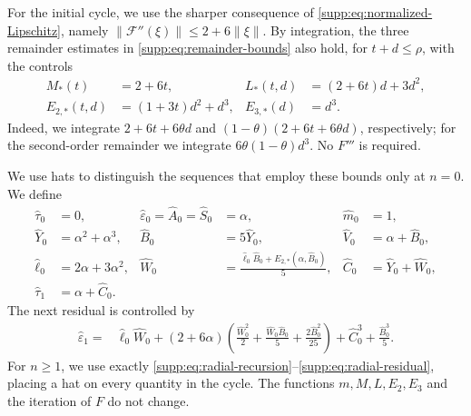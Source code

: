 \documentclass[11pt,a4paper]{article}
\numberwithin{equation}{section}
\numberwithin{table}{section}
\theoremstyle{plain}
\theoremstyle{definition}\newtheorem{definition}[theorem]{Definition}
\theoremstyle{remark}\newtheorem{remark}[theorem]{Remark}
\begin{document}
For the initial cycle, we use the sharper consequence of
\eqref{supp:eq:normalized-Lipschitz}, namely
$\|\mathcal F''(\xi)\|\leq2+6\|\xi\|$. By integration, the
three remainder estimates in \eqref{supp:eq:remainder-bounds} also
hold, for $t+d\leq\rho$, with the controls
\begin{equation}
\begin{aligned}
 M_*(t)&=2+6t,& L_*(t,d)&=(2+6t)d+3d^2,\\
 E_{2,*}(t,d)&=(1+3t)d^2+d^3,& E_{3,*}(d)&=d^3.
\end{aligned}
\label{supp:eq:first-polynomial-controls}
\end{equation}
Indeed, we integrate $2+6t+6\theta d$ and
$(1-\theta)(2+6t+6\theta d)$, respectively; for the second-order
remainder we integrate $6\theta(1-\theta)d^3$. No $F'''$ is required.

We use hats to distinguish the sequences that employ these bounds only
at $n=0$. We define
\begin{equation}
\begin{aligned}
 \widehat\tau_0&=0,&
 \widehat\varepsilon_0=\widehat A_0=\widehat S_0&=\alpha,&
 \widehat m_0&=1,\\
 \widehat Y_0&=\alpha^2+\alpha^3,&
 \widehat B_0&=5\widehat Y_0,&
 \widehat V_0&=\alpha+\widehat B_0,\\
 \widehat\ell_0&=2\alpha+3\alpha^2,&
 \widehat W_0&=\frac{\widehat\ell_0\widehat B_0+
 E_{2,*}(\alpha,\widehat B_0)}5,&
 \widehat C_0&=\widehat Y_0+\widehat W_0,\\
 \widehat\tau_1&=\alpha+\widehat C_0.&&&
\end{aligned}
\label{supp:eq:first-cycle-controls}
\end{equation}
The next residual is controlled by
\begin{equation}
\begin{aligned}
 \widehat\varepsilon_1={}&\widehat\ell_0\widehat W_0
 +(2+6\alpha)\left(\frac{\widehat W_0^2}{2}
 +\frac{\widehat W_0\widehat B_0}{5}
 +\frac{2\widehat B_0^2}{25}\right)
 +\widehat C_0^3+\frac{\widehat B_0^3}{5}.
\end{aligned}
\label{supp:eq:first-cycle-residual}
\end{equation}
For $n\geq1$, we use exactly
\eqref{supp:eq:radial-recursion}--\eqref{supp:eq:radial-residual},
placing a hat on every quantity in the cycle. The functions
$m,M,L,E_2,E_3$ and the iteration of $F$ do not change.
\end{document}
